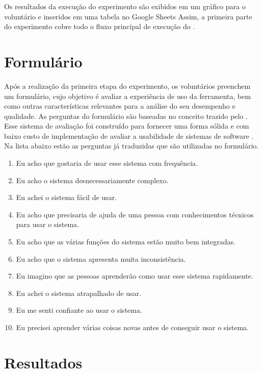 \documentclass[12pt]{tcc}
\begin{document}
	Os resultados da execução do experimento são exibidos em um gráfico para o voluntário e inseridos em uma tabela no Google Sheets
	Assim, a primeira parte do experimento cobre todo o fluxo principal de execução do .


	\section{Formulário}
	\label{section:parte-2-formulario}

	Após a realização da primeira etapa do experimento, os voluntários preenchem um formulário, cujo objetivo é avaliar a experiência de uso da ferramenta, bem como outras características relevantes para a análise do seu desempenho e qualidade. As perguntas do formulário são baseadas no conceito trazido pelo . Esse sistema de avaliação foi construído para fornecer uma forma sólida e com baixo custo de implementação de avaliar a usabilidade de sistemas de software \citep{brooke1995sus}. Na lista abaixo estão as perguntas já traduzidas que são utilizadas no formulário.

	\begin{enumerate}
		\itemsep 0em 

		\item Eu acho que gostaria de usar esse sistema com frequência.
		\item Eu acho o sistema desnecessariamente complexo.
		\item Eu achei o sistema fácil de usar.
		\item Eu acho que precisaria de ajuda de uma pessoa com conhecimentos técnicos para usar o sistema.
		\item Eu acho que as várias funções do sistema estão muito bem integradas.
		\item Eu acho que o sistema apresenta muita inconsistência.
		\item Eu imagino que as pessoas aprenderão como usar esse sistema rapidamente.
		\item Eu achei o sistema atrapalhado de usar.
		\item Eu me senti confiante ao usar o sistema.
		\item Eu precisei aprender várias coisas novas antes de conseguir usar o sistema.
	\end{enumerate}


	\section{Resultados}
	\label{section:resultados}
\end{document}
